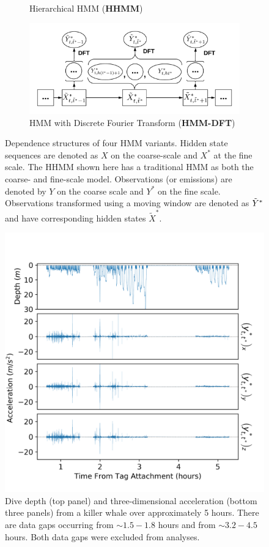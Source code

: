 \begin{figure}[ht]
\begin{subfigure}{\textwidth}
      \caption{Hierarchical HMM (\textbf{HHMM})}
      \label{fig:HHMM}
    \end{subfigure}
    \newline
    \begin{subfigure}{\textwidth}
      \centering
      \includegraphics[width=4in]{../Plots/HMM-DFT.png}  
      \caption{HMM with Discrete Fourier Transform (\textbf{HMM-DFT})}
      \label{fig:HMM-DFT}
    \end{subfigure}
    \caption{Dependence structures of four HMM variants. Hidden state sequences are denoted as $X$ on the coarse-scale and $X^*$ at the fine scale. The HHMM shown here has a traditional HMM as both the coarse- and fine-scale model. Observations (or emissions) are denoted by $Y$ on the coarse scale and $Y^*$ on the fine scale. Observations transformed using a moving window are denoted as $\tilde{Y}^*$ and have corresponding hidden states $\tilde X^*$.}
    \label{fig:models}
\end{figure}


\begin{figure}[ht]
	\centering
	\includegraphics[width=5.25in]{../Plots/raw_data.png}
	\caption{Dive depth (top panel) and three-dimensional acceleration (bottom three panels) from a killer whale over approximately 5 hours. There are data gaps occurring from $\sim 1.5-1.8$ hours and from $\sim 3.2-4.5$ hours. Both data gaps were excluded from analyses.}
	\label{fig:data}
\end{figure}

